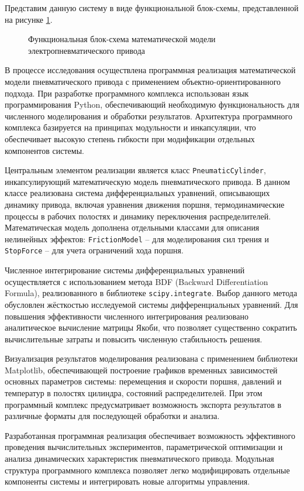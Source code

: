 Представим данную систему в виде функциональной блок-схемы, представленной на рисунке \ref{fig:ch2/block_diagram}.

\begin{figure}[ht]
    \caption{Функциональная блок-схема математической модели электропневматического привода}
    \label{fig:ch2/block_diagram}
\end{figure}

В процессе исследования осуществлена программная реализация математической модели пневматического привода с применением объектно-ориентированного подхода.
При разработке программного комплекса использован язык программирования Python, обеспечивающий необходимую функциональность для численного моделирования и
обработки результатов. Архитектура программного комплекса базируется на принципах модульности и инкапсуляции, что обеспечивает высокую степень гибкости при
модификации отдельных компонентов системы.

Центральным элементом реализации является класс \texttt{PneumaticCylinder}, инкапсулирующий математическую модель пневматического привода.
В данном классе реализована система дифференциальных уравнений, описывающих динамику привода, включая уравнения движения поршня,
термодинамические процессы в рабочих полостях и динамику переключения распределителей. Математическая модель дополнена отдельными
классами для описания нелинейных эффектов: \texttt{FrictionModel} -- для моделирования сил трения и \texttt{StopForce} -- для учета ограничений хода поршня.

Численное интегрирование системы дифференциальных уравнений осуществляется с использованием метода BDF (Backward Differentiation Formula),
реализованного в библиотеке \texttt{scipy.integrate}. Выбор данного метода обусловлен жёсткостью исследуемой системы дифференциальных
уравнений. Для повышения эффективности численного интегрирования реализовано аналитическое вычисление матрицы Якоби, что позволяет существенно
сократить вычислительные затраты и повысить численную стабильность решения.

Визуализация результатов моделирования реализована с применением библиотеки Matplotlib, обеспечивающей
построение графиков временных зависимостей основных параметров системы: перемещения и скорости поршня, давлений и температур
в полостях цилиндра, состояний распределителей. При этом программный комплекс предусматривает возможность экспорта результатов
в различные форматы для последующей обработки и анализа.

Разработанная программная реализация обеспечивает возможность эффективного проведения вычислительных экспериментов,
параметрической оптимизации и анализа динамических характеристик пневматического привода. Модульная структура программного
комплекса позволяет легко модифицировать отдельные компоненты системы и интегрировать новые алгоритмы управления.